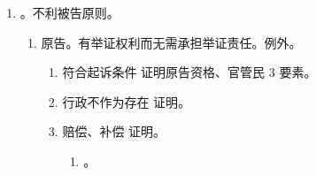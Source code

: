 \begin{enumerate}
\begin{enumerate}
                \begin{enumerate}
                  \item 执法现场、制作主体是行政机关、签名或盖章。
                        \begin{enumerate}
                          \item {}。
                          \item {}。
                          \item {}。
                        \end{enumerate}
                  \item 拒绝签名 \yjt 注明即可。不在场 \yjt 请见证人，二者互斥。。
                \end{enumerate}
          \item 涉外证据。见三国。
          \item 考原告 vs 被告证据证明力问题。白纸黑字 > 说的。说的 vs 说的别看反了。
                \begin{enumerate}
                  \item {}。
                  \item {}。
                  \item {}。
                  \item {}。
                \end{enumerate}
        \end{enumerate}
  \item {}。不利被告原则。
        \begin{enumerate}
          \item 原告。有举证权利而无需承担举证责任。例外。
                \begin{enumerate}
                  \item 符合起诉条件 \yjt 证明原告资格、官管民 3 要素。
                  \item 行政不作为存在 \yjt 证明。
                  \item 赔偿、补偿 \yjt 证明。
                        \begin{enumerate}
                          \item {}。

\end{enumerate}
\end{enumerate}
\end{enumerate}
\end{enumerate}
